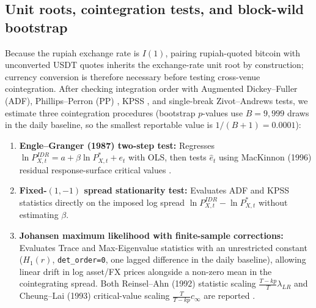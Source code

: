 \subsection{Unit roots, cointegration tests, and block-wild bootstrap}
Because the rupiah exchange rate is $I(1)$, pairing rupiah-quoted bitcoin with unconverted USDT quotes inherits the exchange-rate unit root by construction; currency conversion is therefore necessary before testing cross-venue cointegration. After checking integration order with Augmented Dickey--Fuller (ADF), Phillips--Perron (PP) \citep{phillips1988testing}, KPSS \citep{kwiatkowski1992testing}, and single-break Zivot--Andrews \citep{zivot1992further} tests, we estimate three cointegration procedures (bootstrap $p$-values use $B = 9{,}999$ draws in the daily baseline, so the smallest reportable value is $1/(B+1) = 0.0001$):
\begin{enumerate}
  \item \textbf{Engle--Granger (1987) two-step test:} Regresses $\ln P_{X,t}^{IDR} = a + \beta \ln P_{X,t}^{*} + e_t$ with OLS, then tests $\hat{e}_t$ using MacKinnon (1996) residual response-surface critical values \citep{engle1987cointegration,mackinnon1996numerical}.
  \item \textbf{Fixed-$(1,-1)$ spread stationarity test:} Evaluates ADF and KPSS statistics directly on the imposed log spread $\ln P_{X,t}^{IDR} - \ln P_{X,t}^{*}$ without estimating $\beta$.
  \item \textbf{Johansen maximum likelihood with finite-sample corrections:} Evaluates Trace and Max-Eigenvalue statistics with an unrestricted constant ($H_1(r)$, \texttt{det\_order=0}, one lagged difference in the daily baseline), allowing linear drift in log asset/FX prices alongside a non-zero mean in the cointegrating spread. Both Reinsel--Ahn (1992) statistic scaling $\frac{T - kp}{T}\lambda_{LR}$ and Cheung--Lai (1993) critical-value scaling $\frac{T}{T - kp} c_{\infty}$ are reported \citep{johansen1991estimation,reinsel1992vector,cheung1993finite}.

\end{enumerate}
